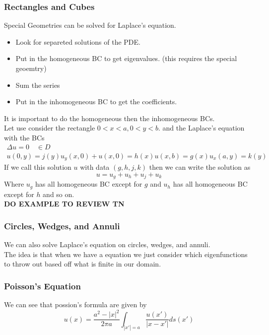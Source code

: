 \documentclass[answers,12pt,addpoints]{exam}
\begin{document}
    \subsubsection{Rectangles and Cubes}
    Special Geometries can be solved for Laplace's equation. \\
    \begin{itemize}
        \item Look for separeted solutions of the PDE.
        \item Put in the homogeneous BC to get eigenvalues. (this requires the special geoemtry)
        \item Sum the series 
        \item Put in the inhomogeneous BC to get the coefficients.
    \end{itemize}
    It is important to do the homogeneous then the inhomogeneous BCs.\\
    Let use consider the rectangle $0 < x < a, 0 < y < b$. and the Laplace's equation with the BCs
    \begin{align*}
        \Delta u = 0 \quad \in D\\
        u(0, y) = j(y)
        u_y(x,0) + u(x, 0) = h(x)
        u(x, b) = g(x)
        u_x(a, y) = k(y)
    \end{align*}
    If we call this solution $u$ with data $(g,h,j,k)$ then we can write the solution as
    $$ u = u_g + u_h + u_j + u_k$$
    Where $u_g$ has all homogeneous BC except for $g$ and $u_h$ has all homogeneous BC except for $h$ and so on.\\
    \textbf{DO EXAMPLE TO REVIEW TN}

    \subsubsection{Circles, Wedges, and Annuli}
    We can also solve Laplace's equation on circles, wedges, and annuli.\\
    The idea is that when we have a equation we just consider which eigenfunctions to throw out based off what is finite in our domain.\\

    \subsubsection{Poisson's Equation}
    We can see that possion's formula are given by
    $$ u(x) = \frac{a^2 - |x|^2}{2\pi a} \int_{|x'|=a} \frac{u(x')}{|x-x'|} ds(x')$$
\end{document}
